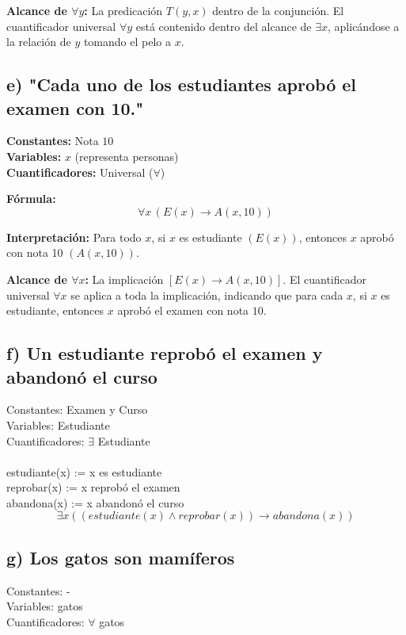 \documentclass[11pt,letterpaper]{article}
\begin{document}
\textbf{Alcance de \( \forall y \):} La predicación \( T(y, x) \) dentro de la conjunción. El cuantificador universal \( \forall y \) está contenido dentro del alcance de \( \exists x \), aplicándose a la relación de \( y \) tomando el pelo a \( x \).


\subsection*{e) "Cada uno de los estudiantes aprobó el examen con 10."}

\textbf{Constantes:} Nota \( 10 \) \\
\textbf{Variables:} \( x \) (representa personas) \\
\textbf{Cuantificadores:} Universal (\( \forall \))

\textbf{Fórmula:}
\[
\forall x \, (E(x) \rightarrow A(x, 10))
\]

\textbf{Interpretación:} Para todo \( x \), si \( x \) es estudiante \( (E(x)) \), entonces \( x \) aprobó con nota 10 \( (A(x, 10)) \).

\textbf{Alcance de \( \forall x \):}
La implicación \( [E(x) \to A(x, 10)] \). El cuantificador universal \( \forall x \) se aplica a toda la implicación, indicando que para cada \( x \), si \( x \) es estudiante, entonces \( x \) aprobó el examen con nota \( 10 \).
\subsection*{f) Un estudiante reprobó el examen y abandonó el curso}
Constantes: Examen y Curso\\
Variables: Estudiante\\
Cuantificadores: $\exists$ Estudiante\\ \\

estudiante(x) := x es estudiante\\
reprobar(x) := x reprobó el examen\\
abandona(x) := x abandonó el curso\\
$$ \exists x ((estudiante(x) \land reprobar(x)) \rightarrow abandona(x))$$

\subsection*{g) Los gatos son mamíferos}
Constantes: -\\
Variables: gatos\\
Cuantificadores: $\forall$ gatos \\ \\
\end{document}
